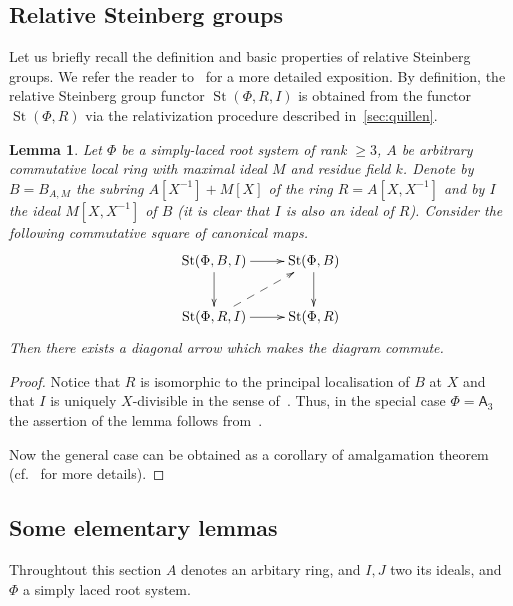 \documentclass[oneside, 8pt]{amsart}
\newtheorem{lemma}{Lemma}
\theoremstyle{remark}
\theoremstyle{definition}
\DeclareMathOperator{\St}{St}
\newcommand{\rA}{\mathsf{A}}
\numberwithin{equation}{section}
\begin{document}
\subsection{Relative Steinberg groups}
Let us briefly recall the definition and basic properties of relative Steinberg groups.
We refer the reader to~\cite[Section~3]{S15} for a more detailed exposition.
By definition, the relative Steinberg group functor $\St(\Phi, R, I)$ is obtained from the functor $\St(\Phi, R)$
 via the relativization procedure described in~\cref{sec:quillen}.

\begin{lemma}\label{lem:lemma32} Let $\Phi$ be a simply-laced root system of rank $\geq 3$,
$A$ be arbitrary commutative local ring with maximal ideal $M$ and residue field $k$.
Denote by $B = B_{A, M}$ the subring $A[X^{-1}] + M[X]$ of the ring $R = A[X, X^{-1}]$ and
by $I$ the ideal $M[X, X^{-1}]$ of $B$ (it is clear that $I$ is also an ideal of $R$).
Consider the following commutative square of canonical maps.
\[ \xymatrix{
    \St(\Phi, B, I) \ar[r] \ar[d] & \St(\Phi, B) \ar[d] \\
    \St(\Phi, R, I) \ar[r] \ar@{-->}[ur] & \St(\Phi, R) } \]
Then there exists a diagonal arrow which makes the diagram commute.   
\end{lemma} 
\begin{proof}
 Notice that $R$ is isomorphic to the principal localisation of $B$ at $X$
  and that $I$ is uniquely $X$-divisible in the sense of~\cite[\S~4]{LS17}.
 Thus, in the special case $\Phi = \rA_3$ the assertion of the lemma follows from~\cite[Theorem~3]{LS17}.
 
 Now the general case can be obtained as a corollary of amalgamation theorem~\cite[Theorem~9]{S15}
  (cf.~\cite[\S~4]{LS17} for more details).
\end{proof}

\subsection{Some elementary lemmas}
\begin{comment}
Hall-Witt identity
\[ [[ y^{-1}, x], z] ^ {y^{-1}}  [[ z^{-1}, y], x] ^ {z^{-1}}  [[ x^{-1}, z], y] ^ {x^{-1}} = 1 \]
\[ [[ y^{-1}, x], z]  \cdot [[ z^{-1}, y], x] ^ {z^{-1}y} \cdot  [[ x^{-1}, z], y] ^ {x^{-1}y} = 1. \]
\[ [[ z^{-1}, y^{-1}], x] ^ {z^{-1}y^{-1}} \cdot  [[ x^{-1}, z], y^{-1}] ^ {x^{-1}y^{-1}} = [z, [ y, x]] . \]
\[  . \]
\end{comment}
Throughtout this section $A$ denotes an arbitary ring, and $I, J$ two its ideals, and $\Phi$ a simply laced root system.
\end{document}
